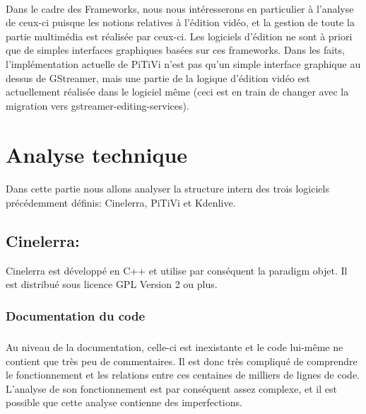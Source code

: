 \paragraph {}

Dans le cadre des Frameworks, nous nous intéresserons en particulier
à l'analyse de ceux-ci puisque les notions relatives à l'édition
vidéo, et la gestion de toute la partie multimédia est réalisée
par ceux-ci. Les logiciels d'édition ne sont à priori que de simples
interfaces graphiques basées sur ces frameworks. Dans les faits,
l'implémentation actuelle de PiTiVi n'est pas qu'un simple interface
graphique au dessus de GStreamer, mais une partie de la logique
d'édition vidéo est actuellement réalisée dans le logiciel même
(ceci est en train de changer avec la migration \cite{PitviPortToGes}
vers gstreamer-editing-services\cite{PresentationOfGes}).

\newpage \section{Analyse technique}

\paragraph {}

Dans cette partie nous allons analyser la structure intern des trois
logiciels précédemment définis: Cinelerra, PiTiVi et Kdenlive.

\subsection{Cinelerra:}

Cinelerra est développé en C++ et utilise par conséquent la paradigm
objet.  Il est distribué sous licence GPL Version 2 ou plus.

\subsubsection{Documentation du code}

\subparagraph{}

Au niveau de la documentation, celle-ci est inexistante et le code
lui-même ne contient que très peu de commentaires. Il est donc très
compliqué de comprendre le fonctionnement et les relations entre ces
centaines de milliers de lignes de code. L'analyse de son fonctionnement
est par conséquent assez complexe, et il est possible que cette analyse
contienne des imperfections.

